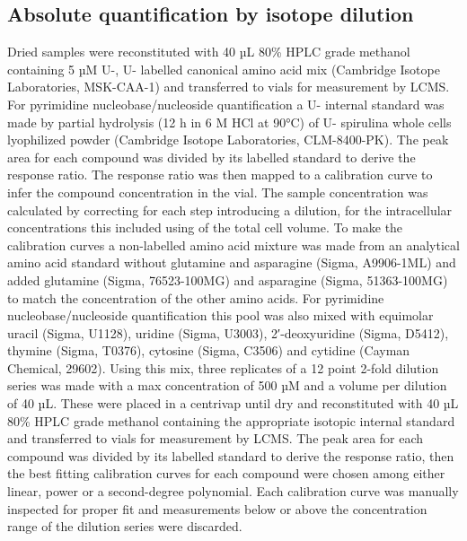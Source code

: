 \subsection{Absolute quantification by isotope dilution}
Dried samples were reconstituted with 40 µL 80\% HPLC grade methanol containing 5 µM U-\hCi, U-\hNi{} labelled canonical amino acid mix (Cambridge Isotope Laboratories, MSK-CAA-1) and transferred to vials for measurement by LCMS.
For pyrimidine nucleobase/nucleoside quantification a U-\hCi{} internal standard was made by partial hydrolysis (12 h in 6 M HCl at 90°C) of U-\hCi{} spirulina whole cells lyophilized powder (Cambridge Isotope Laboratories, CLM-8400-PK).
The peak area for each compound was divided by its labelled standard to derive the response ratio.
The response ratio was then mapped to a calibration curve to infer the compound concentration in the vial.
The sample concentration was calculated by correcting for each step introducing a dilution, for the intracellular concentrations this included using of the total cell volume.
To make the calibration curves a non-labelled amino acid mixture was made from an analytical amino acid standard without glutamine and asparagine (Sigma, A9906-1ML) and added glutamine (Sigma, 76523-100MG) and asparagine (Sigma, 51363-100MG) to match the concentration of the other amino acids.
For pyrimidine nucleobase/nucleoside quantification this pool was also mixed with equimolar uracil (Sigma, U1128), uridine (Sigma, U3003), 2′-deoxyuridine (Sigma, D5412), thymine (Sigma, T0376), cytosine (Sigma, C3506) and cytidine (Cayman Chemical, 29602).
Using this mix, three replicates of a 12 point 2-fold dilution series was made with a max concentration of 500 µM and a volume per dilution of 40 µL.
These were placed in a centrivap until dry and reconstituted with 40 µL 80\% HPLC grade methanol containing the appropriate isotopic internal standard and transferred to vials for measurement by LCMS.
The peak area for each compound was divided by its labelled standard to derive the response ratio, then the best fitting calibration curves for each compound were chosen among either linear, power or a second-degree polynomial.
Each calibration curve was manually inspected for proper fit and measurements below or above the concentration range of the dilution series were discarded.


